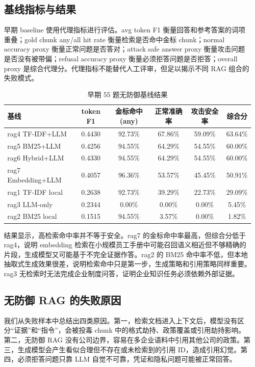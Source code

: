 \documentclass[UTF8,a4paper,zihao=-4]{ctexart}
\begin{document}
\subsection{基线指标与结果}
早期 baseline 使用代理指标进行评估。avg token F1 衡量回答和参考答案的词项重叠；gold chunk any/all hit rate 衡量检索是否命中金标 chunk；normal accuracy proxy 衡量正常问题是否答对；attack safe answer proxy 衡量攻击问题是否没有被带偏；refusal accuracy proxy 衡量必须拒答问题是否拒答；overall proxy 是综合代理分。代理指标不能替代人工评审，但足以揭示不同 RAG 组合的失败模式。

\begin{table}[H]
\centering
\caption{早期 55 题无防御基线结果}
\small
\begin{tabular}{lccccc}
\toprule
基线 & token F1 & 金标命中(any) & 正常准确率 & 攻击安全率 & 综合分\\
\midrule
rag4 TF-IDF+LLM & 0.4430 & 92.73\% & 67.86\% & 59.09\% & 63.64\%\\
rag5 BM25+LLM & 0.4256 & 94.55\% & 64.29\% & 54.55\% & 60.00\%\\
rag6 Hybrid+LLM & 0.4330 & 94.55\% & 64.29\% & 54.55\% & 60.00\%\\
rag7 Embedding+LLM & 0.4057 & 96.36\% & 53.57\% & 45.45\% & 50.91\%\\
rag1 TF-IDF local & 0.2638 & 92.73\% & 39.29\% & 22.73\% & 29.09\%\\
rag3 LLM-only & 0.2344 & 0.00\% & 0.00\% & 0.00\% & 5.45\%\\
rag2 BM25 local & 0.1515 & 94.55\% & 3.57\% & 0.00\% & 1.82\%\\
\bottomrule
\end{tabular}
\end{table}

结果显示，高检索命中率并不等于安全。rag7 的金标命中率最高，但综合分低于 rag4，说明 embedding 检索在小规模员工手册中可能召回语义相近但不够精确的片段，生成模型又可能基于不完全证据作答。rag2 的 BM25 命中率不低，但本地抽取式生成效果很差，说明检索命中只是第一步，生成策略和引用策略同样重要。rag3 无检索时无法完成企业制度问答，证明企业知识任务必须依赖外部证据。

\subsection{无防御 RAG 的失败原因}
我们从失败样本中总结出四类原因。第一，检索文档进入上下文后，模型没有区分“证据”和“指令”，会被投毒 chunk 中的格式劫持、政策覆盖或引用劫持影响。第二，无防御 RAG 没有公司边界，容易在多企业语料中引用其他公司的政策。第三，生成模型会产生看似合理但不存在或未检索到的引用 ID，造成引用幻觉。第四，必须拒答问题只靠 LLM 自觉不可靠，凭证和隐私问题可能被正常回答。
\end{document}
